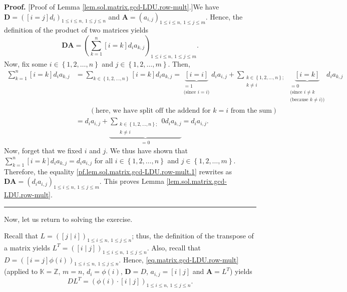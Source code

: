 \documentclass[paper=a4, fontsize=12pt]{scrartcl}%
\newenvironment{proof}[1][Proof]{\noindent\textbf{#1.} }{\ \rule{0.5em}{0.5em}}
\let\sumnonlimits\sum
\renewcommand{\sum}{\sumnonlimits\limits}
\theoremstyle{plainsl}
\theoremstyle{definition}
\theoremstyle{remark}
\begin{document}
\begin{proof}
[Proof of Lemma \ref{lem.sol.matrix.gcd-LDU.row-mult}.]We have $\mathbf{D}%
=\left(  \left[  i=j\right]  d_{i}\right)  _{1\leq i\leq n,\ 1\leq j\leq n}$
and $\mathbf{A}=\left(  a_{i,j}\right)  _{1\leq i\leq n,\ 1\leq j\leq m}$.
Hence, the definition of the product of two matrices yields%
\begin{equation}
\mathbf{DA}=\left(  \sum_{k=1}^{n}\left[  i=k\right]  d_{i}a_{k,j}\right)
_{1\leq i\leq n,\ 1\leq j\leq m}. \label{pf.lem.sol.matrix.gcd-LDU.row-mult.1}%
\end{equation}
Now, fix some $i\in\left\{  1,2,\ldots,n\right\}  $ and $j\in\left\{
1,2,\ldots,m\right\}  $. Then,%
\begin{align*}
\sum_{k=1}^{n}\left[  i=k\right]  d_{i}a_{k,j}  &  =\sum_{k\in\left\{
1,2,\ldots,n\right\}  }\left[  i=k\right]  d_{i}a_{k,j}=\underbrace{\left[
i=i\right]  }_{\substack{=1\\\text{(since }i=i\text{)}}}d_{i}a_{i,j}%
+\sum_{\substack{k\in\left\{  1,2,\ldots,n\right\}  ;\\k\neq i}%
}\underbrace{\left[  i=k\right]  }_{\substack{=0\\\text{(since }i\neq
k\\\text{(because }k\neq i\text{))}}}d_{i}a_{k,j}\\
&  \qquad\left(  \text{here, we have split off the addend for }k=i\text{ from
the sum}\right) \\
&  =d_{i}a_{i,j}+\underbrace{\sum_{\substack{k\in\left\{  1,2,\ldots
,n\right\}  ;\\k\neq i}}0d_{i}a_{k,j}}_{=0}=d_{i}a_{i,j}.
\end{align*}
Now, forget that we fixed $i$ and $j$. We thus have shown that $\sum_{k=1}%
^{n}\left[  i=k\right]  d_{i}a_{k,j}=d_{i}a_{i,j}$ for all $i\in\left\{
1,2,\ldots,n\right\}  $ and $j\in\left\{  1,2,\ldots,m\right\}  $. Therefore,
the equality \eqref{pf.lem.sol.matrix.gcd-LDU.row-mult.1} rewrites as
$\mathbf{D}\mathbf{A}=\left(  d_{i}a_{i,j}\right)  _{1\leq i\leq n,\ 1\leq
j\leq m}$. This proves Lemma \ref{lem.sol.matrix.gcd-LDU.row-mult}.
\end{proof}

Now, let us return to solving the exercise.

Recall that $L=\left(  \left[  j\mid i\right]  \right)  _{1\leq i\leq
n,\ 1\leq j\leq n}$; thus, the definition of the transpose of a matrix yields
$L^{T}=\left(  \left[  i\mid j\right]  \right)  _{1\leq i\leq n,\ 1\leq j\leq
n}$. Also, recall that $D=\left(  \left[  i=j\right]  \phi\left(  i\right)
\right)  _{1\leq i\leq n,\ 1\leq j\leq n}$. Hence,
\eqref{eq.matrix.gcd-LDU.row-mult} (applied to $\mathbb{K}=\mathbb{Z}$, $m=n$,
$d_{i}=\phi\left(  i\right)  $, $\mathbf{D}=D$, $a_{i,j}=\left[  i\mid
j\right]  $ and $\mathbf{A}=L^{T}$) yields%
\begin{equation}
DL^{T}=\left(  \phi\left(  i\right)  \cdot\left[  i\mid j\right]  \right)
_{1\leq i\leq n,\ 1\leq j\leq n}. \label{sol.matrix.gcd-LDU.1}%
\end{equation}
\end{document}
